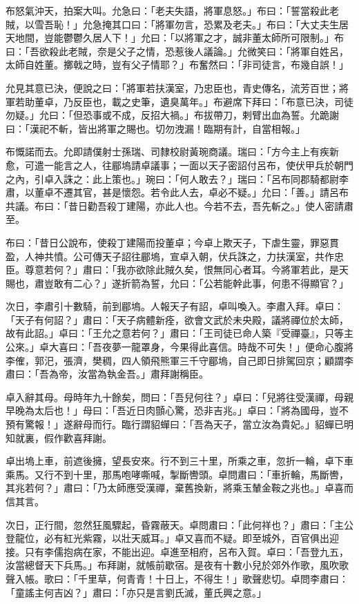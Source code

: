 布怒氣沖天，拍案大叫。允急曰：「老夫失語，將軍息怒。」布曰：「誓當殺此老賊，以雪吾恥！」允急掩其口曰：「將軍勿言，恐累及老夫。」布曰：「大丈夫生居天地間，豈能鬱鬱久居人下！」允曰：「以將軍之才，誠非董太師所可限制。」布曰：「吾欲殺此老賊，奈是父子之情，恐惹後人議論。」允微笑曰：「將軍自姓呂，太師自姓董。擲戟之時，豈有父子情耶？」布奮然曰：「非司徒言，布幾自誤！」

允見其意已決，便說之曰：「將軍若扶漢室，乃忠臣也，青史傳名，流芳百世；將軍若助董卓，乃反臣也，載之史筆，遺臭萬年。」布避席下拜曰：「布意已決，司徒勿疑。」允曰：「但恐事或不成，反招大禍。」布拔帶刀，剌臂出血為誓。允跪謝曰：「漢祀不斬，皆出將軍之賜也。切勿洩漏！臨期有計，自當相報。」

布慨諾而去。允即請僕射士孫瑞、司隸校尉黃琬商議。瑞曰：「方今主上有疾新愈，可遣一能言之人，往郿塢請卓議事；一面以天子密詔付呂布，使伏甲兵於朝門之內，引卓入誅之：此上策也。」琬曰：「何人敢去？」瑞曰：「呂布同郡騎都尉李肅，以董卓不遷其官，甚是懷怨。若令此人去，卓必不疑。」允曰：「善。」請呂布共議。布曰：「昔日勸吾殺丁建陽，亦此人也。今若不去，吾先斬之。」使人密請肅至。

布曰：「昔日公說布，使殺丁建陽而投董卓；今卓上欺天子，下虐生靈，罪惡貫盈，人神共憤。公可傳天子詔往郿塢，宣卓入朝，伏兵誅之，力扶漢室，共作忠臣。尊意若何？」肅曰：「我亦欲除此賊久矣，恨無同心者耳。今將軍若此，是天賜也，肅豈敢有二心？」遂折箭為誓，允曰：「公若能幹此事，何患不得顯官？」

次日，李肅引十數騎，前到郿塢。人報天子有詔，卓叫喚入。李肅入拜。卓曰：「天子有何詔？」肅曰：「天子病體新痊，欲會文武於未央殿，議將禪位於太師，故有此詔。」卓曰：「王允之意若何？」肅曰：「王司徒已命人築『受禪臺』，只等主公來。」卓大喜曰：「吾夜夢一龍罩身，今果得此喜信。時哉不可失！」便命心腹將李傕，郭汜，張濟，樊稠，四人領飛熊軍三千守郿塢，自己即日排駕回京；顧謂李肅曰：「吾為帝，汝當為執金吾。」肅拜謝稱臣。

卓入辭其母。母時年九十餘矣，問曰：「吾兒何往？」卓曰：「兒將往受漢禪，母親早晚為太后也！」母曰：「吾近日肉顫心驚，恐非吉兆。」卓曰：「將為國母，豈不預有驚報！」遂辭母而行。臨行謂貂蟬曰：「吾為天子，當立汝為貴妃。」貂蟬已明知就裏，假作歡喜拜謝。

卓出塢上車，前遮後擁，望長安來。行不到三十里，所乘之車，忽折一輪，卓下車乘馬。又行不到十里，那馬咆哮嘶喊，掣斷轡頭。卓問肅曰：「車折輪，馬斷轡，其兆若何？」肅曰：「乃太師應受漢禪，棄舊換新，將乘玉輦金鞍之兆也。」卓喜而信其言。

次日，正行間，忽然狂風驟起，昏霧蔽天。卓問肅曰：「此何祥也？」肅曰：「主公登龍位，必有紅光紫霧，以壯天威耳。」卓又喜而不疑。即至城外，百官俱出迎接。只有李儒抱病在家，不能出迎。卓進至相府，呂布入賀。卓曰：「吾登九五，汝當總督天下兵馬。」布拜謝，就帳前歇宿。是夜有十數小兒於郊外作歌，風吹歌聲入帳。歌曰：「千里草，何青青！十日上，不得生！」歌聲悲切。卓問李肅曰：「童謠主何吉凶？」肅曰：「亦只是言劉氏滅，董氏興之意。」

